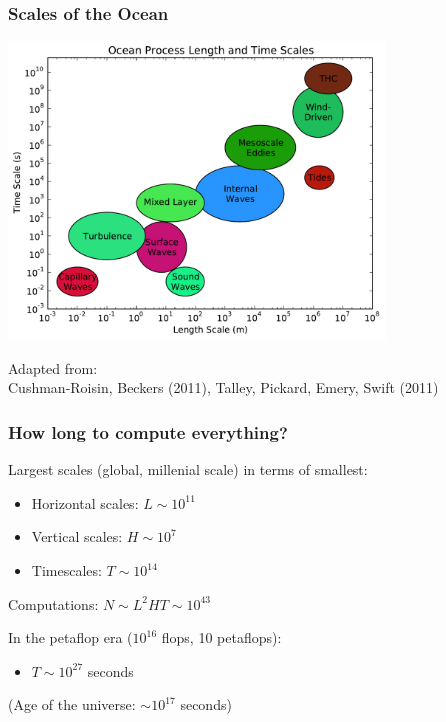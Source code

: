 \documentclass{beamer}
\begin{document}
\begin{frame}
    \frametitle{Scales of the Ocean}
    
    \begin{center}
        \includegraphics[width=0.75\textwidth]{ocean_scales.pdf}
    \end{center}
    
    {\tiny Adapted from:\\
        Cushman-Roisin, Beckers (2011), Talley, Pickard, Emery, Swift (2011)}
\end{frame}

\begin{frame}
    \frametitle{How long to compute everything?}
    
    Largest scales (global, millenial scale) in terms of smallest:
    \begin{itemize}
        \item Horizontal scales: $L \sim 10^{11}$
        \item Vertical scales: $H \sim 10^7$
        \item Timescales: $T \sim 10^{14}$
    \end{itemize}
    Computations: $N \sim L^2 H T \sim 10^{43}$
    
    \vspace{10pt}
    
    In the petaflop era ($10^{16}$ flops, 10 petaflops):
    \begin{itemize}
        \item $T \sim 10^{27}$ seconds
    \end{itemize}
    (Age of the universe: $\sim 10^{17}$ seconds)
\end{frame}
\end{document}
